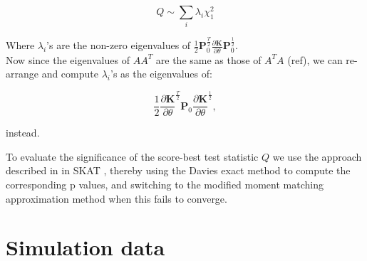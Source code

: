 \begin{equation}
    Q \sim \sum_i \lambda_i \chi^2_1 
\end{equation}

Where $\lambda_i$'s are the non-zero eigenvalues of $\frac{1}{2}\mathbf{P}_0^{\frac{T}{2}} \frac{\partial\mathbf{K}}{\partial \theta} \mathbf{P}_0^{\frac{1}{2}}$.\\

Now since the eigenvalues of $AA^T$ are the same as those of $A^TA$ (ref), we can re-arrange and compute $\lambda_i$'s as the eigenvalues of:

\begin{equation}
    \frac{1}{2}\frac{\partial\mathbf{K}}{\partial \theta}^{\frac{T}{2}} \mathbf{P}_0 \frac{\partial\mathbf{K}}{\partial \theta}^{\frac{1}{2}},
\end{equation}

instead.

To evaluate the significance of the score-best test statistic $Q$ we use the approach described in in SKAT \cite{wu2011rare}, thereby using the Davies exact method \cite{davies1980algorithm} to compute the corresponding p values, and switching to the modified moment matching approximation method \cite{liu2009new, lee2012optimal, duchesne2010computing} when this fails to converge.






\newpage

\section{Simulation data}

